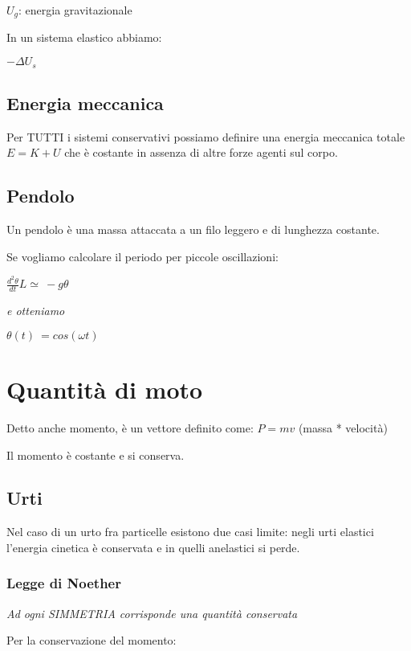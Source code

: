 \(U_{g}\): energia gravitazionale

In un sistema elastico abbiamo:

\(- \Delta U_{s}\)

\subsection{Energia meccanica}\label{energia-meccanica}

Per TUTTI i sistemi conservativi possiamo definire una energia meccanica
totale \(E = K + U\) che è costante in assenza di altre forze agenti sul
corpo.

\subsection{Pendolo}\label{pendolo}

Un pendolo è una massa attaccata a un filo leggero e di lunghezza
costante.

Se vogliamo calcolare il periodo per piccole oscillazioni:

\(\frac{d^{2}\theta}{dt}L \simeq \  - g\theta\)

\emph{e otteniamo}

\(\theta(t)\  = cos(\omega t)\)

\section{Quantità di moto}\label{quantituxe0-di-moto}

Detto anche momento, è un vettore definito come: \(P = mv\) (massa *
velocità)

Il momento è costante e si conserva.

\subsection{Urti}\label{urti}

Nel caso di un urto fra particelle esistono due casi limite: negli urti
elastici l'energia cinetica è conservata e in quelli anelastici si
perde.

\subsubsection{Legge di Noether}\label{legge-di-noether}

\emph{Ad ogni SIMMETRIA corrisponde una quantità conservata}

Per la conservazione del momento:

